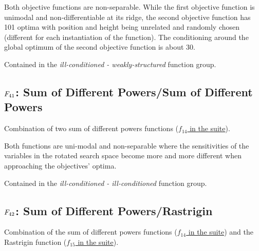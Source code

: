 Both objective functions are non-separable.
While the first objective function is unimodal and non-differentiable at
its ridge, the second objective function
has 101 optima with position and height being unrelated and randomly
chosen (different for each instantiation of the function). The
conditioning around the global optimum of the second objective function
is about 30.

Contained in the \emph{ill-conditioned - weakly-structured} function group.



\subsection[\texorpdfstring{\protect\(F_{41}\protect\): Sum of Different Powers/Sum of Different Powers}{F41: Sum of Different Powers/Sum of Different Powers}]{\texorpdfstring{\protect\(F_{41}\protect\): Sum of Different Powers/Sum of Different Powers}{}}
\label{index:f41}\label{index:sum-of-different-powers-sum-of-different-powers}
Combination of two sum of different powers functions
(\href{https://coco.gforge.inria.fr/downloads/download16.00/bbobdocfunctions.pdf\#page=70}{\(f_{14}\) in the \bbob suite}).

Both functions are uni-modal and non-separable where the sensitivities of
the variables in the rotated search space become more and more different
when approaching the objectives' optima.

Contained in the \emph{ill-conditioned - ill-conditioned} function group.



\subsection[\texorpdfstring{\protect\(F_{42}\protect\): Sum of Different Powers/Rastrigin}{F42: Sum of Different Powers/Rastrigin}]{\texorpdfstring{\protect\(F_{42}\protect\): Sum of Different Powers/Rastrigin}{}}
\label{index:f42}\label{index:sum-of-different-powers-rastrigin}
Combination of the sum of different powers functions
(\href{https://coco.gforge.inria.fr/downloads/download16.00/bbobdocfunctions.pdf\#page=70}{\(f_{14}\) in the \bbob suite}) and the Rastrigin function
(\href{https://coco.gforge.inria.fr/downloads/download16.00/bbobdocfunctions.pdf\#page=75}{\(f_{15}\) in the \bbob suite}).

